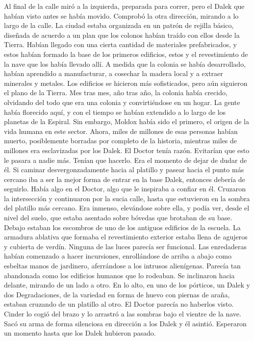 Al final de la calle miró a la izquierda, preparada para correr, pero el Dalek que habían visto antes se había movido. Comprobó la otra dirección, mirando a lo largo de la calle.
La ciudad estaba organizada en un patrón de rejilla básico, diseñada de acuerdo a un plan que los colonos habían traído con ellos desde la Tierra. Habían llegado con una cierta cantidad de materiales prefabricados, y estos habían formado la base de los primeros edificios, estos y el revestimiento de la nave que los había llevado allí. A medida que la colonia se había desarrollado, habían aprendido a manufacturar, a cosechar la madera local y a extraer minerales y metales. Los edificios se hicieron más sofisticados, pero aún siguieron el plano de la Tierra. Mes tras mes, año tras año, la colonia había crecido, olvidando del todo que era una colonia y convirtiéndose en un hogar.
La gente había florecido aquí, y con el tiempo se habían extendido a lo largo de los planetas de la Espiral. Sin embargo, Moldox había sido el primero, el origen de la vida humana en este sector. Ahora, miles de millones de esas personas habían muerto, posiblemente borradas por completo de la historia, mientras miles de millones era esclavizadas por los Dalek.
El Doctor tenía razón. Evitarían que esto le pasara a nadie más. Tenían que hacerlo. Era el momento de dejar de dudar de él. Si caminar desvergonzadamente hacia al platillo y pasear hacia el punto más cercano iba a ser la mejor forma de entrar en la base Dalek, entonces debería de seguirlo. Había algo en el Doctor, algo que le inspiraba a confiar en él.
Cruzaron la intersección y continuaron por la sucia calle, hasta que estuvieron en la sombra del platillo más cercano. Era inmenso, elevándose sobre ella, y podía ver, desde el nivel del suelo, que estaba asentado sobre bóvedas que brotaban de su base. Debajo estaban los escombros de uno de los antiguos edificios de la escuela. La armadura ablativa que formaba el revestimiento exterior estaba llena de agujeros y cubierta de verdín. Ninguna de las luces parecía ser funcional. Las enredaderas habían comenzado a hacer incursiones, enrollándose de arriba a abajo como esbeltas manos de jardinero, aferrándose a los intrusos alienígenas. Parecía tan abandonada como los edificios humanos que lo rodeaban.
Se inclinaron hacia delante, mirando de un lado a otro. En lo alto, en uno de los pórticos, un Dalek y dos Degradaciones, de la variedad en forma de huevo con piernas de araña, estaban cruzando de un platillo al otro. El Doctor parecía no haberlos visto. Cinder lo cogió del brazo y lo arrastró a las sombras bajo el vientre de la nave. Sacó su arma de forma silenciosa en dirección a los Dalek y él asintió. Esperaron un momento hasta que los Dalek hubieron pasado.


